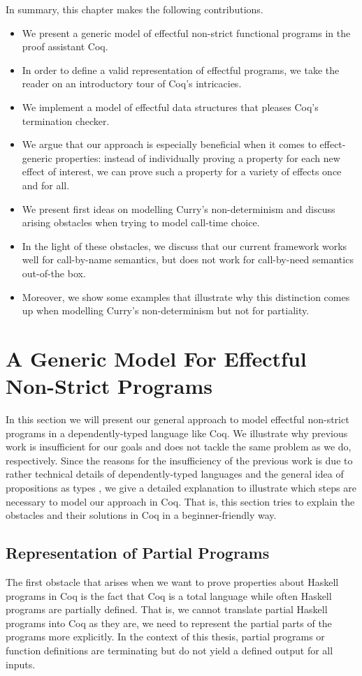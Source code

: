 In summary, this chapter makes the following contributions.

\begin{itemize}
\item We present a generic model of effectful non\--strict functional programs in the proof assistant Coq.
\item In order to define a valid representation of effectful programs, we take the reader on an introductory tour of Coq's intricacies.
\item We implement a model of effectful data structures that pleases Coq's termination checker.
\item We argue that our approach is especially beneficial when it comes to effect\--generic properties: instead of individually proving a property for each new effect of interest, we can prove such a property for a variety of effects once and for all.
\item We present first ideas on modelling Curry's non\--determinism and discuss arising obstacles when trying to model call\--time choice.
\item In the light of these obstacles, we discuss that our current framework works well for call\--by\--name semantics, but does not work for call\--by\--need semantics out\--of\--the box.
\item Moreover, we show some examples that illustrate why this distinction comes up when modelling Curry's non\--determinism but not for partiality.
\end{itemize}
 
\section{A Generic Model For Effectful Non\--Strict Programs}

In this section we will present our general approach to model effectful non\--strict programs in a dependently\--typed language like Coq.
We illustrate why previous work is insufficient for our goals and does not tackle the same problem as we do, respectively.
Since the reasons for the insufficiency of the previous work is due to rather technical details of dependently\--typed languages and the general idea of propositions as types \citep{wadler2015propositions}, we give a detailed explanation to illustrate which steps are necessary to model our approach in Coq.
That is, this section tries to explain the obstacles and their solutions in Coq in a beginner\--friendly way.

\subsection{Representation of Partial Programs}
\label{subsec:partial}
The first obstacle that arises when we want to prove properties about Haskell programs in Coq is the fact that Coq is a total language while often Haskell programs are partially defined.
That is, we cannot translate partial Haskell programs into Coq as they are, we need to represent the partial parts of the programs more explicitly.
In the context of this thesis, partial programs or function definitions are terminating but do not yield a defined output for all inputs.

